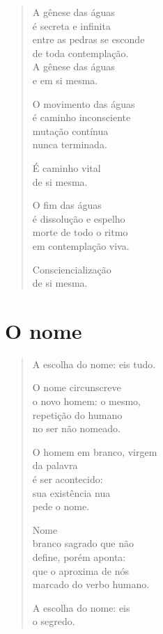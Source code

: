 \begin{verse}
A gênese das águas\\
é secreta e infinita\\
entre as pedras se esconde\\
de toda contemplação.\\
A gênese das águas\\
e em si mesma.

\dotline{4.8cm}

O movimento das águas\\
é caminho inconsciente\\
mutação contínua\\
nunca terminada.

É caminho vital\\
de si mesma.

\dotline{4.8cm}

O fim das águas\\
é dissolução e espelho\\
morte de todo o ritmo\\
em contemplação viva.

Consciencialização\\
de si mesma.
\end{verse}

\chapter{O nome}

\begin{verse}
A escolha do nome: eis tudo.

O nome circunscreve\\
o novo homem: o mesmo,\\
repetição do humano\\
no ser não nomeado.

O homem em branco, virgem\\
da palavra\\
é ser acontecido:\\
sua existência nua\\
pede o nome.

Nome\\
branco sagrado que não\\
define, porém aponta:\\
que o aproxima de nós\\
marcado do verbo humano.

A escolha do nome: eis\\
o segredo.
\end{verse}

